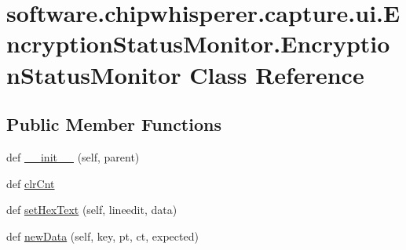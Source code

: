 \hypertarget{classsoftware_1_1chipwhisperer_1_1capture_1_1ui_1_1EncryptionStatusMonitor_1_1EncryptionStatusMonitor}{}\section{software.\+chipwhisperer.\+capture.\+ui.\+Encryption\+Status\+Monitor.\+Encryption\+Status\+Monitor Class Reference}
\label{classsoftware_1_1chipwhisperer_1_1capture_1_1ui_1_1EncryptionStatusMonitor_1_1EncryptionStatusMonitor}
\subsection*{Public Member Functions}
\begin{DoxyCompactItemize}
\item 
def \hyperlink{classsoftware_1_1chipwhisperer_1_1capture_1_1ui_1_1EncryptionStatusMonitor_1_1EncryptionStatusMonitor_a815c0d8950f9c79a6264246207187a22}{\+\_\+\+\_\+init\+\_\+\+\_\+} (self, parent)
\item 
def \hyperlink{classsoftware_1_1chipwhisperer_1_1capture_1_1ui_1_1EncryptionStatusMonitor_1_1EncryptionStatusMonitor_a11dd1a2de027276c169339e8f7c1b923}{clr\+Cnt}
\item 
def \hyperlink{classsoftware_1_1chipwhisperer_1_1capture_1_1ui_1_1EncryptionStatusMonitor_1_1EncryptionStatusMonitor_a8b484590c67b298622bb70cf62562a14}{set\+Hex\+Text} (self, lineedit, data)
\item 
def \hyperlink{classsoftware_1_1chipwhisperer_1_1capture_1_1ui_1_1EncryptionStatusMonitor_1_1EncryptionStatusMonitor_ac22b548d509b8b72167bf3a7ac0c42e3}{new\+Data} (self, key, pt, ct, expected)
\end{DoxyCompactItemize}
